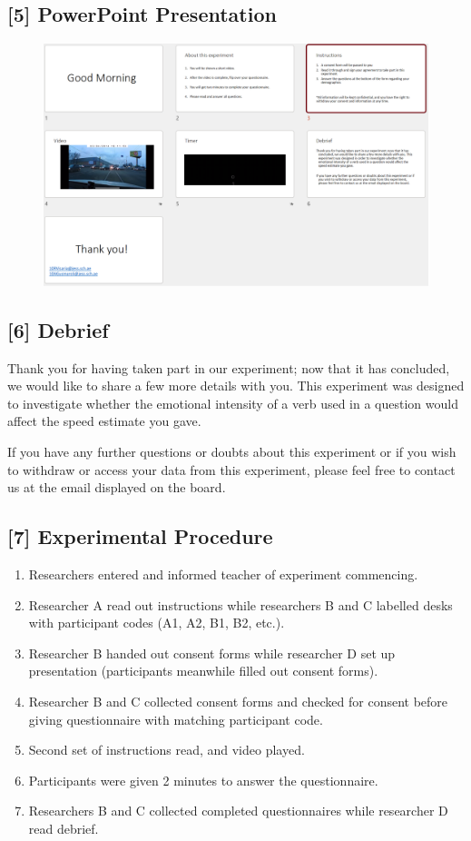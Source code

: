 \documentclass[12pt]{article}
\begin{document}
\subsection*{[5] PowerPoint Presentation}
\begin{figure}[H]
	\includegraphics[scale=0.5]{ppt}
	\centering
\end{figure}

\subsection*{[6] Debrief}
Thank you for having taken part in our experiment; now that it has concluded, we would like to share a few more details with you. This experiment was designed to investigate whether the emotional intensity of a verb used in a question would affect the speed estimate you gave.

If you have any further questions or doubts about this experiment or if you wish to withdraw or access your data from this experiment, please feel free to contact us at the email displayed on the board.

\subsection*{[7] Experimental Procedure}
\begin{enumerate}
	\item Researchers entered and informed teacher of experiment commencing.
	\item Researcher A read out instructions while researchers B and C labelled desks with participant codes (A1, A2, B1, B2, etc.).
	\item Researcher B handed out consent forms while researcher D set up presentation (participants meanwhile filled out consent forms). 
	\item Researcher B and C collected consent forms and checked for consent before giving questionnaire with matching participant code.
	\item Second set of instructions read, and video played. 
	\item Participants were given 2 minutes to answer the questionnaire.
	\item Researchers B and C collected completed questionnaires while researcher D read debrief. 
\end{enumerate}
\end{document}
